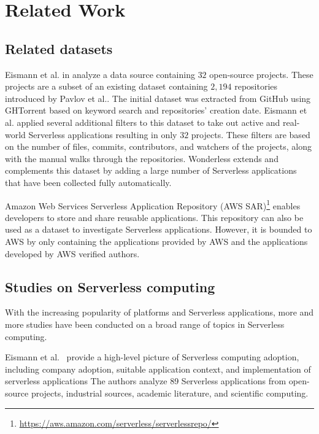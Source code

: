 
\section{Related Work}
\label{relatedwork}

\subsection{Related datasets}
Eismann et al. in \cite{eismann2020serverless} analyze a data source 
containing $32$ open-source projects. These projects are a subset of 
an existing dataset containing $2,194$ repositories introduced by 
Pavlov et al.\cite{pavlov2019serverless}. The initial dataset was extracted 
from GitHub using GHTorrent based on keyword search and repositories' 
creation date. Eismann et al. applied several additional filters to this dataset 
to take out active and real-world Serverless applications resulting in only $32$
projects. These filters are based on the number of files, commits, 
contributors, and watchers of the projects, along with the manual walks 
through the repositories. Wonderless extends and complements 
this dataset by adding a large number of Serverless applications that 
have been collected fully automatically.

Amazon Web Services Serverless Application Repository
(AWS SAR)\footnote{\url{https://aws.amazon.com/serverless/serverlessrepo/}} 
enables developers to store and share reusable applications. 
This repository can also be used as a dataset to investigate Serverless 
applications. However, it is bounded to AWS by only containing the 
applications provided by AWS and the applications developed by 
AWS verified authors.


\subsection{Studies on Serverless computing}

With the increasing popularity of \faas platforms and Serverless applications, 
more and more studies have been conducted on a broad range of topics in 
Serverless computing. 

Eismann et al.~\cite{eismann2020serverless} provide a  
high-level picture of Serverless computing adoption, including 
company adoption, suitable application context, and implementation 
of serverless applications
The authors analyze 89 Serverless applications from open-source projects, 
industrial sources, academic literature, and scientific computing. 


